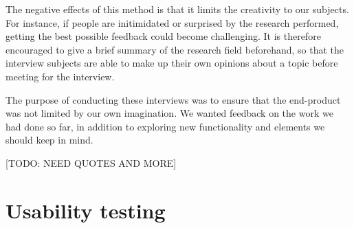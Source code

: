 The negative effects of this method is that it limits the creativity to our subjects. For instance, if people are initimidated or surprised by the research performed, getting the best possible feedback could become challenging. It is therefore encouraged to give a brief summary of the research field beforehand, so that the interview subjects are able to make up their own opinions about a topic before meeting for the interview.   

The purpose of conducting these interviews was to ensure that the end-product was not limited by our own imagination. We wanted feedback on the work we had done so far, in addition to exploring new functionality and elements we should keep in mind.

[TODO: NEED QUOTES AND MORE]

\section{Usability testing}
\label{sec:usabilitytesting}


